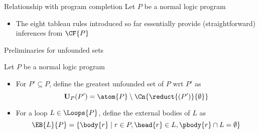 \begin{frame}{Relationship with program completion}
Let $P$ be a normal logic program

\begin{itemize}
\item <1-> The eight tableau rules introduced so far essentially provide
  (straightforward) inferences from $\CF{P}$  %
\end{itemize}
\end{frame}
\begin{frame}{Preliminaries for unfounded sets}

Let $P$ be a normal logic program
\begin{itemize}
\item<1-> For $P'\subseteq P$, define the \alert{greatest unfounded set} of $P$ wrt $P'$ as
\[
\mathbf{U}_P(P') = \atom{P}\setminus \Cn{\reduct{(P')}{\emptyset}}
\]
\item<2-> For a loop $L \in \Loops{P}$, define the \alert{external bodies} of $L$ as
\[
\EB{L}{P} = \{\body{r} \mid r \in P, \head{r} \in L, \pbody{r} \cap L = \emptyset\}
\]
\end{itemize}
\end{frame}
